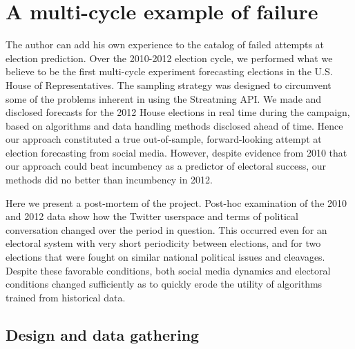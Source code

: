 \documentclass{article}
\begin{document}
\section{A multi-cycle example of failure}
\label{sec:multi-cycle-example}


The author can add his own experience to the catalog of failed
attempts at election prediction. Over the 2010-2012 election cycle, we
performed what we believe to be the first multi-cycle experiment
forecasting elections in the U.S. House of Representatives. The
sampling strategy was designed to circumvent some of the problems
inherent in using the Streatming API. We made and disclosed forecasts
for the 2012 House elections in real time during the campaign, based
on algorithms and data handling methods disclosed ahead of time. Hence
our approach constituted a true out-of-sample, forward-looking attempt
at election forecasting from social media. However, despite evidence
from 2010 that our approach could beat incumbency as a predictor of
electoral success, our methods did no better than incumbency in 2012.

Here we present a post-mortem of the project. Post-hoc examination of
the 2010 and 2012 data show how the Twitter userspace and terms of
political conversation changed over the period in question. This
occurred even for an electoral system with very short periodicity
between elections, and for two elections that were fought on similar
national political issues and cleavages. Despite these favorable
conditions, both social media dynamics and electoral conditions
changed sufficiently as to quickly erode the utility of algorithms
trained from historical data. 

\subsection{Design and data gathering}
\label{sec:design-data-gath}
\end{document}
